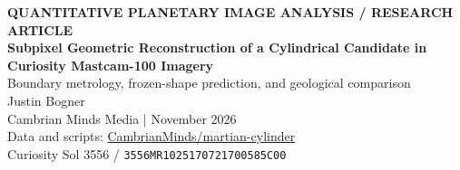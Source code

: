 \documentclass[11pt,letterpaper]{article}
\newcommand{\repo}{\href{https://github.com/CambrianMinds/martian-cylinder}{CambrianMinds/martian-cylinder}}
\newcommand{\pdsid}{\texttt{3556MR1025170721700585C00}}
\begin{document}
\thispagestyle{empty}
\vspace*{-0.24in}
\noindent{\color{accent}\rule{\linewidth}{2.2pt}}\par\vspace{13pt}
{\footnotesize\sffamily\bfseries\color{accent} QUANTITATIVE PLANETARY IMAGE ANALYSIS \quad / \quad RESEARCH ARTICLE}\\[12pt]
{\fontsize{22}{26}\selectfont\bfseries\color{ink} Subpixel Geometric Reconstruction of a Cylindrical Candidate in Curiosity Mastcam-100 Imagery}\\[8pt]
{\large\color{slate} Boundary metrology, frozen-shape prediction, and geological comparison}\\[17pt]
{\large Justin Bogner}\\[3pt]
{\small\color{slate} Cambrian Minds Media \quad |  November 2026}\\[9pt]
{\footnotesize\color{slate} Data and scripts: \repo}\\[2pt]
{\footnotesize\color{slate} Curiosity Sol 3556 \quad / \quad \pdsid}\\[8pt]
\par\noindent{\color{fine}\rule{\linewidth}{0.5pt}}\par
\end{document}
